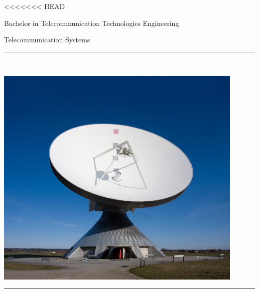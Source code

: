 \documentclass[../main.tex]{subfiles}
\begin{document}
\begin{titlepage}
	\begin{sffamily}
<<<<<<< HEAD
		\color{azulUC3M}

		\begin{center}

			\begin{figure}[H]
			\end{figure}
			\vspace{1.5cm}

			{\Large Bachelor in Telecommunication Technologies Engineering}\\

			\vspace*{0.2cm}

			{\Huge Telecommunication Systems}\\

			\vspace*{0.5cm}
			\rule{10.5cm}{0.1mm}\\
			\vspace*{0.6cm}

			\includegraphics[width=12cm]{images/UC3M/Erdfunkstelle_Raisting_2.jpg}

			\rule{10.5cm}{0.1mm}\\
			\vspace*{0.5cm}


\end{center}
\end{sffamily}
\end{titlepage}
\end{document}
